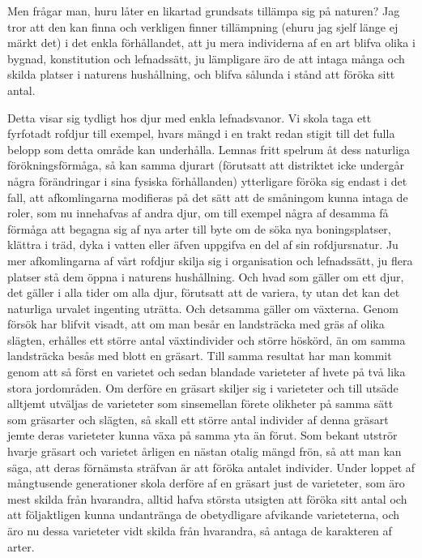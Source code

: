 Men frågar man, huru låter en likartad grundsats tillämpa sig på naturen? Jag tror att den kan finna och verkligen finner tillämpning (ehuru jag sjelf länge ej märkt det) i det enkla förhållandet, att ju mera individerna af en art blifva olika i bygnad, konstitution och lefnadssätt, ju lämpligare äro de att intaga många och skilda platser i naturens hushållning, och blifva sålunda i stånd att föröka sitt antal.

Detta visar sig tydligt hos djur med enkla lefnadsvanor. Vi skola taga ett fyrfotadt rofdjur till exempel, hvars mängd i en trakt redan stigit till det fulla belopp som detta område kan underhålla. Lemnas fritt spelrum åt dess naturliga förökningsförmåga, så kan samma djurart (förutsatt att distriktet icke undergår några förändringar i sina fysiska förhållanden) ytterligare föröka sig endast i det fall, att afkomlingarna modifieras på det sätt att de småningom kunna intaga de roler, som nu innehafvas af andra djur, om till exempel några af desamma få förmåga att begagna sig af nya arter till byte om de söka nya boningsplatser, klättra i träd, dyka i vatten eller äfven uppgifva en del af sin rofdjursnatur. Ju mer afkomlingarna af vårt rofdjur skilja sig i organisation och lefnadssätt, ju flera platser stå dem öppna i naturens hushållning. Och hvad som gäller om ett djur, det gäller i alla tider om alla djur, förutsatt att de variera, ty utan det kan det naturliga urvalet ingenting uträtta. Och detsamma gäller om växterna. Genom försök har blifvit visadt, att om man besår en landsträcka med gräs af olika slägten, erhålles ett större antal växtindivider och större höskörd, än om samma landsträcka besås med blott en gräsart. Till samma resultat har man kommit genom att så först en varietet och sedan blandade varieteter af hvete på två lika stora jordområden. Om derföre en gräsart skiljer sig i varieteter och till utsäde alltjemt utväljas de varieteter som sinsemellan förete olikheter på samma sätt som gräsarter och slägten, så skall ett större antal individer af denna gräsart jemte deras varieteter kunna växa på samma yta än förut. Som bekant utströr hvarje gräsart och varietet årligen en nästan otalig mängd frön, så att man kan säga, att deras förnämsta sträfvan är att föröka antalet individer. Under loppet af mångtusende generationer skola derföre af en gräsart just de varieteter, som äro mest skilda från hvarandra, alltid hafva största utsigten att föröka sitt antal och att följaktligen kunna undantränga de obetydligare afvikande varieteterna, och äro nu dessa varieteter vidt skilda från hvarandra, så antaga de karakteren af arter.

